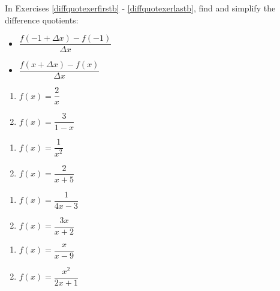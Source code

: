 In Exercises \ref{diffquotexerfirstb} - \ref{diffquotexerlastb}, find and simplify the difference quotients:

\begin{multicols}{2}

\begin{itemize}

\item  $\dfrac{f(-1+\Delta x) - f(-1)}{\Delta x}$

\item  $\dfrac{f(x+\Delta x) - f(x)}{\Delta x}$

\end{itemize}

\end{multicols}

\begin{multicols}{2}
\begin{enumerate}
\setcounter{enumi}{\value{HW}}

\item $f(x) = \dfrac{2}{x}$  \label{diffquotexerfirstb}
\item $f(x) = \dfrac{3}{1-x}$

\setcounter{HW}{\value{enumi}}
\end{enumerate}
\end{multicols}

\begin{multicols}{2}
\begin{enumerate}
\setcounter{enumi}{\value{HW}}

\item  $f(x) = \dfrac{1}{x^2}$
\item  $f(x) = \dfrac{2}{x+5}$

\setcounter{HW}{\value{enumi}}
\end{enumerate}
\end{multicols}

\begin{multicols}{2}
\begin{enumerate}
\setcounter{enumi}{\value{HW}}

\item $f(x) = \dfrac{1}{4x-3}$ 
\item $f(x) = \dfrac{3x}{x+2}$ 

\setcounter{HW}{\value{enumi}}
\end{enumerate}
\end{multicols}

\begin{multicols}{2}
\begin{enumerate}
\setcounter{enumi}{\value{HW}}

\item $f(x) = \dfrac{x}{x - 9}$
\item $f(x) = \dfrac{x^2}{2x+1}$  \label{diffquotexerlastb}

\setcounter{HW}{\value{enumi}}
\end{enumerate}
\end{multicols}

